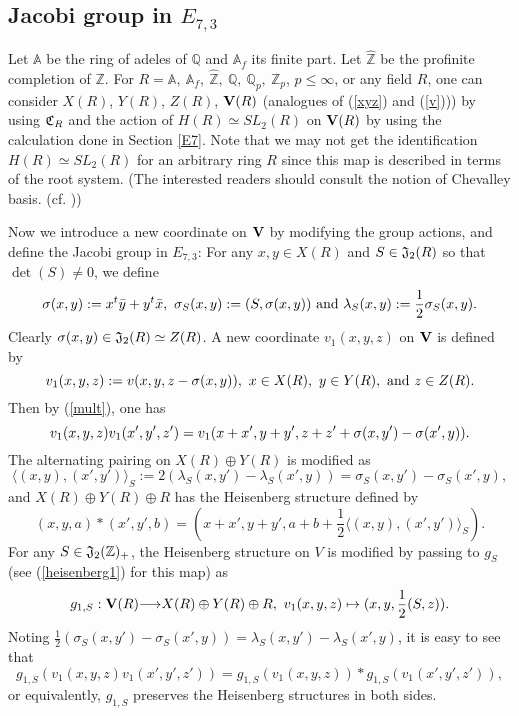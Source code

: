 \documentclass[11pt]{amsart}
\numberwithin{equation}{section}
\theoremstyle{definition}
\begin{document}
\subsection{Jacobi group in $E_{7,3}$}
Let ${\mathbb{A}}$ be the ring of adeles of ${\mathbb{Q}}$ and ${\mathbb{A}}_f$ its finite part. 
Let $\widehat{\mathbb{Z}}$ be the profinite completion of $\mathbb{Z}$. 
For $R={\mathbb{A}},\ {\mathbb{A}}_f,\ \widehat{\mathbb{Z}},\ {\mathbb{Q}},\ {\mathbb{Q}}_p,\ {\mathbb{Z}}_p$, $p\leq \infty$, or any field $R$, one can consider $X(R)$, $Y(R)$, $Z(R)$, 
$\bold V(R)$ 
(analogues of (\ref{xyz}) and (\ref{v}))) 
by using $\frak C_R$ and the action of $H(R)\simeq SL_2(R)$ on 
$\bold V(R)$ by using the calculation done in Section \ref{E7}. Note that we may not get the identification 
$H(R)\simeq SL_2(R)$ for an arbitrary ring $R$ since this map is described in terms of the root system.  
(The interested readers should consult the notion of Chevalley basis. (cf. \cite{steinberg}))  

Now we introduce a new coordinate on $\bold V$ by modifying the group actions, and define the Jacobi group in $E_{7,3}$:
For any $x,y\in X(R)$ and $S\in \frak  J_2(R)$ so that $\det(S)\not=0$, 
we define 
\begin{equation}\label{quadratic}
\sigma(x,y):=x{}^t\bar{y}+y{}^t\bar{x},\ \sigma_S(x,y):=(S,\sigma(x,y)) \ {\rm and}\ 
\lambda_S(x,y):=\frac{1}{2}\sigma_S(x,y).
\end{equation}
Clearly $\sigma(x,y)\in  \frak  J_2(R)\simeq Z(R)$. A new coordinate $v_1(x,y,z)$ on $\bold V$ is defined by  
$$v_1(x,y,z):=v(x,y,z-\sigma(x,y)),\ x\in X(R),\ y\in Y(R),\ {\rm and}\ z\in Z(R).
$$
Then by (\ref{mult}), one has 
\begin{equation}{\label{mult2}}
v_1(x,y,z)v_1(x',y',z')=v_1(x+x',y+y',z+z'+\sigma(x,y')-\sigma(x',y)).
\end{equation}
The alternating pairing on $X(R)\oplus Y(R)$ is modified as   
\begin{equation}\label{alt}
\langle(x,y),(x',y')\rangle_S:=2(\lambda_S(x,y')-\lambda_S(x',y))=\sigma_S(x,y')-\sigma_S(x',y),
\end{equation}
and $X(R)\oplus Y(R)\oplus R$ has the Heisenberg structure defined by 
$$(x,y,a)\ast(x',y',b)=(x+x',y+y',a+b+\frac{1}{2}\langle(x,y),(x',y')\rangle_S).$$ 
For any  $S\in \frak J_2({\mathbb{Z}})_{+}$, the Heisenberg structure on $V$ is modified by passing to $g_S$ 
(see (\ref{heisenberg1}) for this map) as 
\begin{equation}\label{heisenberg2}
g_{1,S}:\bold V(R){\longrightarrow} X(R)\oplus Y(R)\oplus R,\ v_1(x,y,z)\mapsto (x,y,\frac{1}{2}(S,z)).
\end{equation}
Noting $\frac{1}{2}(\sigma_S(x,y')-\sigma_S(x',y))=\lambda_S(x,y')-\lambda_S(x',y)$, 
it is easy to see that 
$$g_{1,S}(v_1(x,y,z)v_1(x',y',z'))=g_{1,S}(v_1(x,y,z))\ast g_{1,S}(v_1(x',y',z')),
$$ 
or equivalently, $g_{1,S}$ preserves the Heisenberg structures in both sides. 
\end{document}

